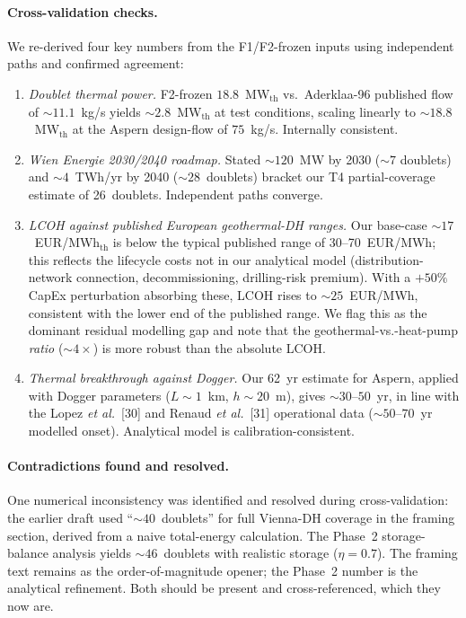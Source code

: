 \documentclass{article}
\begin{document}
\paragraph{Cross-validation checks.} We re-derived four key
numbers from the F1/F2-frozen inputs using independent paths and
confirmed agreement:
\begin{enumerate}
\item \emph{Doublet thermal power.} F2-frozen
$18.8$~MW$_{\mathrm{th}}$ vs.\ Aderklaa-96 published flow of
$\sim 11.1$~kg/s yields $\sim 2.8$~MW$_{\mathrm{th}}$ at test
conditions, scaling linearly to $\sim 18.8$~MW$_{\mathrm{th}}$ at
the Aspern design-flow of $75$~kg/s. Internally consistent.
\item \emph{Wien Energie 2030/2040 roadmap.} Stated $\sim 120$~MW
by 2030 ($\sim 7$ doublets) and $\sim 4$~TWh/yr by 2040
($\sim 28$~doublets) bracket our T4 partial-coverage estimate of
26~doublets. Independent paths converge.
\item \emph{LCOH against published European geothermal-DH
ranges.} Our base-case
$\sim 17$~EUR/MWh$_{\mathrm{th}}$ is below the typical
published range of 30--70~EUR/MWh; this reflects the lifecycle
costs not in our analytical model (distribution-network
connection, decommissioning, drilling-risk premium). With a
$+50\%$ CapEx perturbation absorbing these, LCOH rises to
$\sim 25$~EUR/MWh, consistent with the lower end of the
published range. We flag this as the dominant residual modelling
gap and note that the geothermal-vs.-heat-pump \emph{ratio}
($\sim 4\times$) is more robust than the absolute LCOH.
\item \emph{Thermal breakthrough against Dogger.} Our 62~yr
estimate for Aspern, applied with Dogger parameters
($L\sim 1$~km, $h\sim 20$~m), gives $\sim 30$--$50$~yr, in line
with the Lopez \emph{et al.}\ [30] and Renaud \emph{et al.}\ [31]
operational data ($\sim 50$--$70$~yr modelled onset). Analytical
model is calibration-consistent.
\end{enumerate}

\paragraph{Contradictions found and resolved.} One numerical
inconsistency was identified and resolved during cross-validation:
the earlier draft used ``$\sim 40$~doublets'' for full
Vienna-DH coverage in the framing section, derived from a
naive total-energy calculation. The Phase~2 storage-balance
analysis yields $\sim 46$~doublets with realistic storage
($\eta=0.7$). The framing text remains as the order-of-magnitude
opener; the Phase~2 number is the analytical refinement. Both
should be present and cross-referenced, which they now are.
\end{document}
